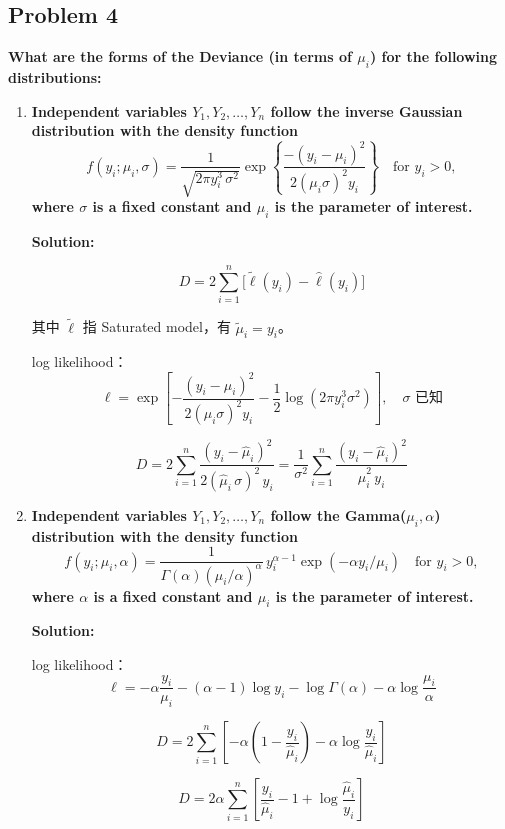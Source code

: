 \subsection{Problem 4}

\textbf{What are the forms of the Deviance (in terms of $\mu_i$) for the following distributions:}

\begin{enumerate}
\item[(a)] \textbf{Independent variables $Y_1,Y_2,\ldots,Y_n$ follow the inverse Gaussian distribution with the density function}
\[
f(y_i;\mu_i,\sigma) = \frac{1}{\sqrt{2\pi y_i^3\,\sigma^2}}\exp\!\left\{\frac{-(y_i-\mu_i)^2}{2(\mu_i\sigma)^2 y_i}\right\} \quad \text{for } y_i > 0,
\]
\textbf{where $\sigma$ is a fixed constant and $\mu_i$ is the parameter of interest.}

\textbf{Solution:}

\[
D = 2\sum_{i=1}^n\bigl[\tilde{\ell}(y_i) - \hat{\ell}(y_i)\bigr]
\]

其中 $\tilde{\ell}$ 指 Saturated model，有 $\tilde{\mu}_i = y_i$。

log likelihood：
\[
\ell = \exp\!\left[-\frac{(y_i-\mu_i)^2}{2(\mu_i\sigma)^2 y_i} - \frac{1}{2}\log(2\pi y_i^3\sigma^2)\right], \quad \sigma \text{ 已知}
\]

\[
\boxed{D = 2\sum_{i=1}^n \frac{(y_i - \hat{\mu}_i)^2}{2(\hat{\mu}_i\,\sigma)^2\,y_i} = \frac{1}{\sigma^2}\sum_{i=1}^n \frac{(y_i - \hat{\mu}_i)^2}{\hat{\mu}_i^2\,y_i}}
\]

\bigskip

\item[(b)] \textbf{Independent variables $Y_1,Y_2,\ldots,Y_n$ follow the Gamma($\mu_i,\alpha$) distribution with the density function}
\[
f(y_i;\mu_i,\alpha) = \frac{1}{\Gamma(\alpha)(\mu_i/\alpha)^\alpha}\, y_i^{\alpha-1}\exp(-\alpha y_i/\mu_i) \quad \text{for } y_i > 0,
\]
\textbf{where $\alpha$ is a fixed constant and $\mu_i$ is the parameter of interest.}

\textbf{Solution:}

log likelihood：
\[
\ell = -\alpha\frac{y_i}{\mu_i} - (\alpha-1)\log y_i - \log\Gamma(\alpha) - \alpha\log\frac{\mu_i}{\alpha}
\]

\[
D = 2\sum_{i=1}^n\left[-\alpha\!\left(1 - \frac{y_i}{\hat{\mu}_i}\right) - \alpha\log\frac{y_i}{\hat{\mu}_i}\right]
\]

\[
\boxed{D = 2\alpha\sum_{i=1}^n\left[\frac{y_i}{\hat{\mu}_i} - 1 + \log\frac{\hat{\mu}_i}{y_i}\right]}
\]

\end{enumerate}